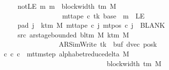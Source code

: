 \begin{isabellebody}
\ \ \ \ \ \ \ notLE{\isacharcolon}{\kern0pt}\ {\isachardoublequoteopen}{\isasymAnd}m{\isachardot}{\kern0pt}\ m\ {\isasymle}\ block{\isacharunderscore}{\kern0pt}width\ {\isacharparenleft}{\kern0pt}{\isasymGamma}{\isacharunderscore}{\kern0pt}tm\ M{\isacharparenright}{\kern0pt}\isanewline
\ \ \ \ \ \ \ \ \ \ \ \ \ \ \ \ \ \ \ {\isasymLongrightarrow}\ mt{\isacharunderscore}{\kern0pt}tape\ c{\isacharprime}{\kern0pt}\ tk\ {\isacharparenleft}{\kern0pt}base\ {\isacharplus}{\kern0pt}\ m{\isacharparenright}{\kern0pt}\ {\isasymnoteq}\ LE{}{\isachardoublequoteclose}\isanewline
\ \ \ \ \ \ \ pad{}{\isacharcolon}{\kern0pt}\ {\isachardoublequoteopen}{\isasymforall}j\ {\isasymge}\ k{\isacharunderscore}{\kern0pt}tm\ M{\isachardot}{\kern0pt}\ mt{\isacharunderscore}{\kern0pt}tape\ c{\isacharprime}{\kern0pt}\ j\ {\isacharparenleft}{\kern0pt}mt{\isacharunderscore}{\kern0pt}pos\ c{\isacharprime}{\kern0pt}\ j{\isacharparenright}{\kern0pt}\ {\isacharequal}{\kern0pt}\ BLANK{}{\isachardoublequoteclose}\isanewline
\ \ \ \ \ \ \ src{}{\isacharcolon}{\kern0pt}\ {\isachardoublequoteopen}ar{\isacharunderscore}{\kern0pt}stage{\isacharunderscore}{\kern0pt}bounded\ {\isacharparenleft}{\kern0pt}bl{\isacharunderscore}{\kern0pt}tm\ M{\isacharparenright}{\kern0pt}\ {\isacharparenleft}{\kern0pt}k{\isacharunderscore}{\kern0pt}tm\ M{\isacharparenright}{\kern0pt}\isanewline
\ \ \ \ \ \ \ \ \ \ \ \ \ \ \ \ \ \ \ {\isacharparenleft}{\kern0pt}AR{\isacharunderscore}{\kern0pt}SimWrite{\isacharcomma}{\kern0pt}\ tk{\isacharcomma}{\kern0pt}\ {}{\isacharcomma}{\kern0pt}\ buf{\isacharcomma}{\kern0pt}\ dvec{\isacharcomma}{\kern0pt}\ posk{\isacharparenright}{\kern0pt}{\isachardoublequoteclose}\isanewline
\ \ \ {\isachardoublequoteopen}{\isasymexists}c{\isacharprime}{\kern0pt}{\isacharprime}{\kern0pt}{\isachardot}{\kern0pt}\ {\isacharparenleft}{\kern0pt}c{\isacharprime}{\kern0pt}{\isacharcomma}{\kern0pt}\ c{\isacharprime}{\kern0pt}{\isacharprime}{\kern0pt}{\isacharparenright}{\kern0pt}\ {\isasymin}\ {\isacharparenleft}{\kern0pt}mttm{\isacharunderscore}{\kern0pt}step\ {\isacharparenleft}{\kern0pt}alphabet{\isacharunderscore}{\kern0pt}reduce{\isacharunderscore}{\kern0pt}delta\ M{\isacharparenright}{\kern0pt}{\isacharparenright}{\kern0pt}\isanewline
\ \ \ \ \ \ \ \ \ \ \ \ \ \ \ \ \ \ \ \ \ \ \ \ \ \ \ \ \ \ {\isacharcircum}{\kern0pt}{\isacharcircum}{\kern0pt}\ {\isacharparenleft}{\kern0pt}{}\ {\isacharasterisk}{\kern0pt}\ block{\isacharunderscore}{\kern0pt}width\ {\isacharparenleft}{\kern0pt}{\isasymGamma}{\isacharunderscore}{\kern0pt}tm\ M{\isacharparenright}{\kern0pt}{\isacharparenright}{\kern0pt}\isanewline

\end{isabellebody}
